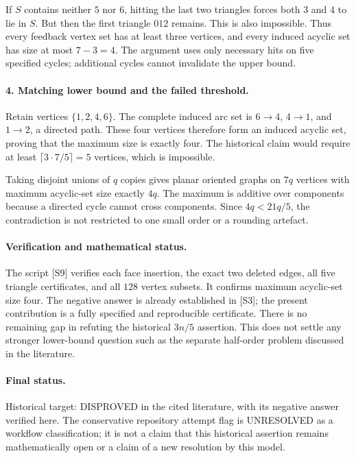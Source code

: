 \documentclass[11pt,a4paper]{article}
\begin{document}
If $S$ contains neither $5$ nor $6$, hitting the last two triangles
forces both $3$ and $4$ to lie in $S$. But then the first triangle
$012$ remains. This is also impossible. Thus every feedback vertex
set has at least three vertices, and every induced acyclic set has
size at most $7-3=4$. The argument uses only necessary hits on five
specified cycles; additional cycles cannot invalidate the upper bound.

\paragraph{4. Matching lower bound and the failed threshold.}
Retain vertices $\{1,2,4,6\}$. The complete induced arc set is
$6\to4$, $4\to1$, and $1\to2$, a directed path. These four vertices
therefore form an induced acyclic set, proving that the maximum size
is exactly four. The historical claim would require at least
$\lceil3\cdot7/5\rceil=5$ vertices, which is impossible.

Taking disjoint unions of $q$ copies gives planar oriented graphs
on $7q$ vertices with maximum acyclic-set size exactly $4q$.
The maximum is additive over components because a directed cycle
cannot cross components. Since $4q<21q/5$, the contradiction is
not restricted to one small order or a rounding artefact.

\paragraph{Verification and mathematical status.}
The script [S9] verifies each face insertion, the exact two deleted
edges, all five triangle certificates, and all $128$ vertex subsets.
It confirms maximum acyclic-set size four. The negative answer is
already established in [S3]; the present contribution is a fully
specified and reproducible certificate. There is no remaining gap
in refuting the historical $3n/5$ assertion. This does not settle
any stronger lower-bound question such as the separate half-order
problem discussed in the literature.

\paragraph{Final status.}
Historical target: DISPROVED in the cited literature, with its negative
answer verified here. The conservative repository attempt flag is
UNRESOLVED as a workflow classification; it is not a claim that this
historical assertion remains mathematically open or a claim of a new
resolution by this model.
\end{document}
